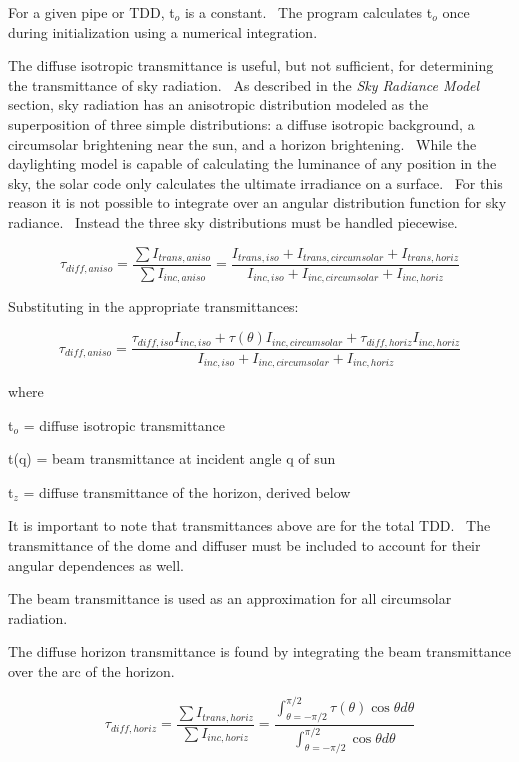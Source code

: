 For a given pipe or TDD, t\(_{o}\) is a constant.~ The program calculates t\(_{o}\) once during initialization using a numerical integration.

The diffuse isotropic transmittance is useful, but not sufficient, for determining the transmittance of sky radiation.~ As described in the \emph{Sky Radiance Model} section, sky radiation has an anisotropic distribution modeled as the superposition of three simple distributions: a diffuse isotropic background, a circumsolar brightening near the sun, and a horizon brightening.~ While the daylighting model is capable of calculating the luminance of any position in the sky, the solar code only calculates the ultimate irradiance on a surface.~ For this reason it is not possible to integrate over an angular distribution function for sky radiance.~ Instead the three sky distributions must be handled piecewise.

\begin{equation}
{\tau_{diff,aniso}} = \frac{{\sum {{I_{trans,aniso}}} }}{{\sum {{I_{inc,aniso}}} }} = \frac{{{I_{trans,iso}} + {I_{trans,circumsolar}} + {I_{trans,horiz}}}}{{{I_{inc,iso}} + {I_{inc,circumsolar}} + {I_{inc,horiz}}}}
\end{equation}

Substituting in the appropriate transmittances:

\begin{equation}
{\tau_{diff,aniso}} = \frac{{{\tau_{diff,iso}}{I_{inc,iso}} + \tau (\theta ){I_{inc,circumsolar}} + {\tau_{diff,horiz}}{I_{inc,horiz}}}}{{{I_{inc,iso}} + {I_{inc,circumsolar}} + {I_{inc,horiz}}}}
\end{equation}

where

t\(_{o}\) = diffuse isotropic transmittance

t(q) = beam transmittance at incident angle q of sun

t\(_{z}\) = diffuse transmittance of the horizon, derived below

It is important to note that transmittances above are for the total TDD.~ The transmittance of the dome and diffuser must be included to account for their angular dependences as well.

The beam transmittance is used as an approximation for all circumsolar radiation.

The diffuse horizon transmittance is found by integrating the beam transmittance over the arc of the horizon.

\begin{equation}
{\tau_{diff,horiz}} = \frac{{\sum {{I_{trans,horiz}}} }}{{\sum {{I_{inc,horiz}}} }} = \frac{{\int_{\theta  =  - \pi /2}^{\pi /2} {\tau (\theta )\cos \theta d\theta } }}{{\int_{\theta  =  - \pi /2}^{\pi /2} {\cos \theta d\theta } }}
\end{equation}

